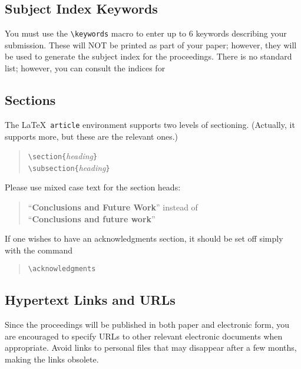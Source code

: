 \documentclass[11pt,twoside]{article}
\def\emphasize#1{{\sl#1\/}}
\def\arg#1{{\it#1\/}}
\begin{document}
\subsection{Subject Index Keywords}

You must use the \verb+\keywords+ macro to enter up to 6 keywords
describing your submission.  These will NOT be printed as part of your
paper; however, they will be used to generate the subject index for the
proceedings.  There is no standard list; however, you can consult the
indices for  

\subsection{Sections}

The \LaTeX\ \verb+article+ environment supports two levels of sectioning.
(Actually, it supports more, but these are the relevant ones.)
\begin{quote}
\verb+\section{+\arg{heading}\verb+}+\\[.5ex]
\verb+\subsection{+\arg{heading}\verb+}+
\end{quote}
Please use mixed case text for the section heads:
\begin{quote}
``{\bf Conclusions and Future Work}'' instead of\\
``{\bf Conclusions and future work}''
\end{quote}

If one wishes to have an acknowledgments section, it should be
set off simply with the command
\begin{quote}
\verb+\acknowledgments+
\end{quote}

\subsection{Hypertext Links and URLs}

Since the proceedings will be published in both paper and electronic
form, you are encouraged to specify URLs to other relevant electronic
documents when appropriate.  Avoid links to personal files that may
disappear after a few months, making the links obsolete.  
\end{document}
